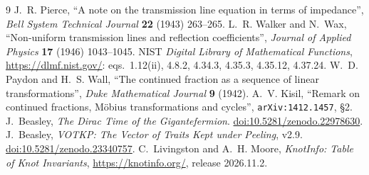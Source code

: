 \documentclass[11pt]{article}
\renewcommand{\_}{\origunderscore\allowbreak}
\begin{document}
\begin{thebibliography}{9}
 J.~R. Pierce, ``A note on the transmission line equation in terms of
impedance'', \emph{Bell System Technical Journal} \textbf{22} (1943) 263--265.
 L.~R. Walker and N.~Wax, ``Non-uniform transmission lines and reflection
coefficients'', \emph{Journal of Applied Physics} \textbf{17} (1946) 1043--1045.
 NIST \emph{Digital Library of Mathematical Functions},
\url{https://dlmf.nist.gov/}: eqs.~1.12(ii), 4.8.2, 4.34.3, 4.35.3, 4.35.12, 4.37.24.
 W.~D. Paydon and H.~S. Wall, ``The continued fraction as a sequence of
linear transformations'', \emph{Duke Mathematical Journal} \textbf{9} (1942).
 A.~V. Kisil, ``Remark on continued fractions, M\"obius transformations and
cycles'', \texttt{arXiv:1412.1457}, \S2.
 J.~Beasley, \emph{The Dirac Time of the Gigantefermion}.
\href{https://doi.org/10.5281/zenodo.22978630}{doi:10.5281/zenodo.22978630}.
 J.~Beasley, \emph{VOTKP: The Vector of Traits Kept under Peeling}, v2.9.
\href{https://doi.org/10.5281/zenodo.23340757}{doi:10.5281/zenodo.23340757}.
 C.~Livingston and A.~H. Moore, \emph{KnotInfo: Table of Knot Invariants},
\url{https://knotinfo.org/}, release 2026.11.2.
\end{thebibliography}
\end{document}
